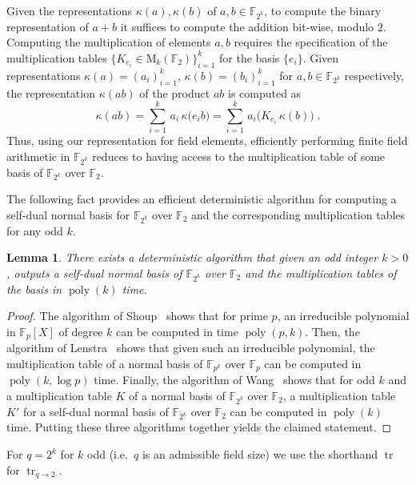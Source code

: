\documentclass[11pt]{article}
\newtheorem{lemma}[theorem]{Lemma}
\theoremstyle{definition}
\newcommand{\F}{\ensuremath{\mathbb{F}}}
\newcommand{\Fp}{\F_p}
\newcommand{\downsize}{\kappa}
\DeclareMathOperator{\poly}{poly}
\DeclareMathOperator{\tr}{tr}
\newcommand{\Matrix}{\mathrm{M}}
\begin{document}
Given the representations $\downsize(a), \downsize(b)$ of $a, b \in \F_{2^k}$, to
compute the binary representation of $a+b$ it suffices to compute the addition
bit-wise, modulo $2$.
Computing the multiplication of elements $a, b$ requires the specification of
the multiplication tables $\{K_{e_i} \in \Matrix_k (\F_2)\}_{i=1}^k $ for the
basis $\{e_i\}$.
Given representations $\downsize(a) = (a_i)_{i=1}^k$, $\downsize(b) =
(b_i)_{i=1}^k$ for $a, b \in \F_{2^k}$ respectively, the representation
$\downsize(ab)$ of the product $ab$ is computed as
\begin{equation}
  \label{eq:eq-mult}
  \downsize(ab) = \sum_{i=1}^k \, a_i \, \downsize \bigl( e_i b \bigr) =
  \sum_{i=1}^k \, a_i \bigl( K_{e_i}\, \downsize (b) \bigr)\;.
\end{equation}
Thus, using our representation for field elements, efficiently performing finite
field arithmetic in $\F_{2^k}$ reduces to having access to the multiplication
table of some basis of $\F_{2^k}$ over $\F_2$.

The following fact provides an efficient deterministic algorithm for computing a
self-dual normal basis for $\F_{2^k}$ over $\F_2$ and the corresponding
multiplication tables for any odd $k$.

\begin{lemma}
  \label{lem:efficient_basis}
  There exists a deterministic algorithm that given an odd integer $k > 0$,
  outputs a self-dual normal basis of $\F_{2^k}$ over $\F_2$ and the
  multiplication tables of the basis in $\poly(k)$ time.
\end{lemma}

\begin{proof}
	The algorithm of Shoup~\cite[Theorem 3.2]{shoup1990new} shows that for prime
  $p$, an irreducible polynomial in $\Fp[X]$ of degree $k$ can be computed in
  time $\poly(p, k)$.
  Then, the algorithm of Lenstra~\cite[Theorem 1.1]{lenstra1991finding} shows
  that given such an irreducible polynomial, the multiplication table of a
  normal basis of $\F_{p^k}$ over $\Fp$ can be computed in $\poly(k,\log p)$
  time.
  Finally, the algorithm of Wang~\cite{wang1989algorithm} shows that for odd $k$
  and a multiplication table $K$ of a normal basis of $\F_{2^k}$ over $\F_2$, a
  multiplication table $K'$ for a self-dual normal basis of $\F_{2^k}$ over
  $\F_2$ can be computed in $\poly(k)$ time.
  Putting these three algorithms together yields the claimed statement.
\end{proof}

For $q=2^k$ for $k$ odd (i.e.\ $q$ is an admissible field size) we use the shorthand $\tr$ for $\tr_{q\to 2}$.
\end{document}
